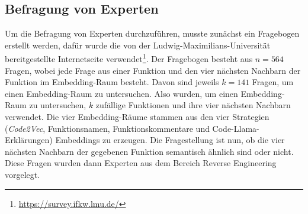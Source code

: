 \documentclass[12pt,letterpaper,ngerman]{article}
\begin{document}
\subsection{Befragung von Experten}
Um die Befragung von Experten durchzuführen, musste zunächst ein
Fragebogen erstellt werden, dafür wurde die von der 
Ludwig-Maximilians-Universität bereitgestellte Internetseite
verwendet\footnote{\url{https://survey.ifkw.lmu.de/}}. Der 
Fragebogen besteht aus $n=564 $ Fragen, wobei jede Frage aus
einer Funktion und den vier nächsten Nachbarn der Funktion im
Embedding-Raum besteht. Davon sind jeweils $k = 141$ Fragen, um
einen Embedding-Raum zu untersuchen. Also wurden, um einen
Embedding-Raum zu untersuchen, $k$ zufällige Funktionen und ihre
vier nächsten Nachbarn verwendet. Die vier Embedding-Räume
stammen aus den vier Strategien (\textit{Code2Vec}, Funktionsnamen,
Funktionskommentare und Code-Llama-Erklärungen) Embeddings zu 
erzeugen. Die Fragestellung ist nun, ob die vier nächsten Nachbarn 
der gegebenen Funktion semantisch ähnlich sind oder nicht.
Diese Fragen wurden dann Experten aus dem Bereich Reverse Engineering
vorgelegt.
\end{document}
